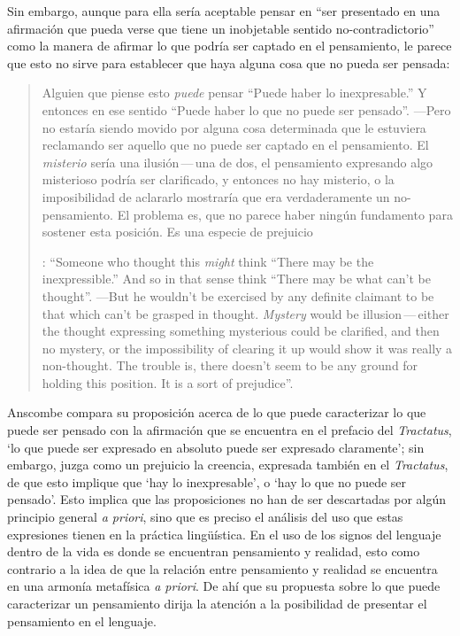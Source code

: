 Sin embargo, aunque para ella sería aceptable pensar en ``ser presentado en una afirmación que pueda verse que tiene un inobjetable sentido no-contradictorio'' como la manera de afirmar lo que podría ser captado en el pensamiento, le parece que esto no sirve para establecer que haya alguna cosa que no pueda ser pensada: \blockquote[{\Cite[8]{anscombe1981parmenides:pmc}}: \enquote{Someone who thought this \emph{might} think ``There may be the inexpressible.'' And so in that sense think ``There may be what can't be thought''. ---But he wouldn't be exercised by any definite claimant to be that which can't be grasped in thought. \emph{Mystery} would be illusion\,---\,either the thought expressing something mysterious could be clarified, and then no mystery, or the impossibility of clearing it up would show it was really a non-thought. The trouble is, there doesn't seem to be any ground for holding this position. It is a sort of prejudice}.]{Alguien que piense esto \emph{puede} pensar ``Puede haber lo inexpresable.'' Y entonces en ese sentido ``Puede haber lo que no puede ser pensado''. ---Pero no estaría siendo movido por alguna cosa determinada que le estuviera reclamando ser aquello que no puede ser captado en el pensamiento. El \emph{misterio} sería una ilusión\,---\,una de dos, el pensamiento expresando algo misterioso podría ser clarificado, y entonces no hay misterio, o la imposibilidad de aclararlo mostraría que era verdaderamente un no-pensamiento. El problema es, que no parece haber ningún fundamento para sostener esta posición. Es una especie de prejuicio}.

Anscombe compara su proposición acerca de lo que puede caracterizar lo que puede ser pensado con la afirmación que se encuentra en el prefacio del \emph{Tractatus}, \enquote*{lo que puede ser expresado en absoluto puede ser expresado claramente}; sin embargo, juzga como un prejuicio la creencia, expresada también en el \emph{Tractatus}, de que esto implique que \enquote*{hay lo inexpresable}, o \enquote*{hay lo que no puede ser pensado}. 
Esto implica que las proposiciones no han de ser descartadas por algún principio general \emph{a priori}, sino que es preciso el análisis del uso que estas expresiones tienen en la práctica lingüística. En el uso de los signos del lenguaje dentro de la vida es donde se encuentran pensamiento y realidad, esto como contrario a la idea de que la relación entre pensamiento y realidad se encuentra en una armonía metafísica \emph{a priori}. De ahí que su propuesta sobre lo que puede caracterizar un pensamiento dirija la atención a la posibilidad de presentar el pensamiento en el lenguaje.

